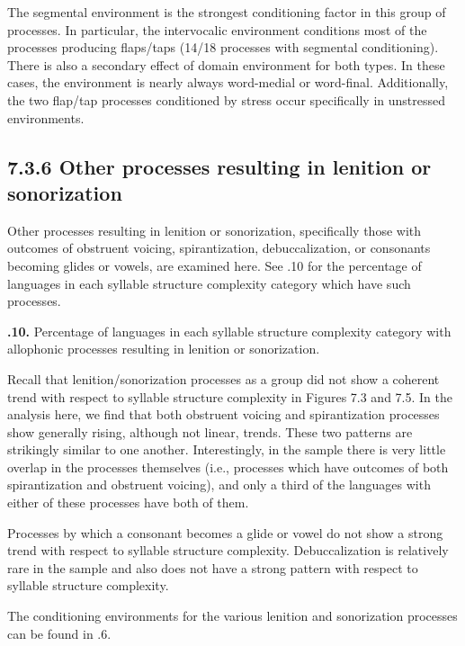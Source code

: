   The segmental environment is the strongest conditioning factor in this group of processes. In particular, the intervocalic environment conditions most of the processes producing flaps/taps (14/18 processes with segmental conditioning). There is also a secondary effect of domain environment for both types. In these cases, the environment is nearly always word-medial or word-final. Additionally, the two flap/tap processes conditioned by stress occur specifically in unstressed environments.

\subsection{7.3.6 Other processes resulting in lenition or sonorization}

  Other processes resulting in lenition or sonorization, specifically those with outcomes of obstruent voicing, spirantization, debuccalization, or consonants becoming glides or vowels, are examined here. See .10 for the percentage of languages in each syllable structure complexity category which have such processes.

\textbf{.10.} Percentage of languages in each syllable structure complexity category with allophonic processes resulting in lenition or sonorization.

  Recall that lenition/sonorization processes as a group did not show a coherent trend with respect to syllable structure complexity in Figures 7.3 and 7.5. In the analysis here, we find that both obstruent voicing and spirantization processes show generally rising, although not linear, trends. These two patterns are strikingly similar to one another. Interestingly, in the sample there is very little overlap in the processes themselves (i.e., processes which have outcomes of both spirantization and obstruent voicing), and only a third of the languages with either of these processes have both of them.

  Processes by which a consonant becomes a glide or vowel do not show a strong trend with respect to syllable structure complexity. Debuccalization is relatively rare in the sample and also does not have a strong pattern with respect to syllable structure complexity.

  The conditioning environments for the various lenition and sonorization processes can be found in .6.

